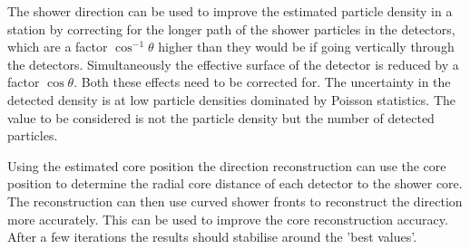 The shower direction can be used to improve the estimated particle density in a station by correcting for the longer path of the shower particles in the detectors, which are a factor $\cos^{-1} \theta$ higher than they would be if going vertically through the detectors. Simultaneously the effective surface of the detector is reduced by a factor $\cos \theta$. Both these effects need to be corrected for. The uncertainty in the detected density is at low particle densities dominated by Poisson statistics. The value to be considered is not the particle density but the number of detected particles. %

Using the estimated core position the direction reconstruction can use the core position to determine the radial core distance of each detector to the shower core. The reconstruction can then use curved shower fronts to reconstruct the direction more accurately. This can be used to improve the core reconstruction accuracy. After a few iterations the results should stabilise around the 'best values'.
